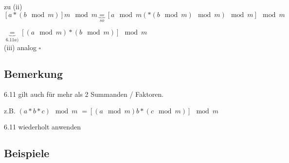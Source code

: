 \documentclass[a4paper, 12pt, twoside] {article}
\begin{document}
 zu (ii) $[a * (b \mod m)] m \mod m \underbrace{=}_{so} [a \mod m( * (b \mod m) \mod m) \mod m] \mod m$

 $\underbrace{=}_{6.11a)} [(a \mod m) * (b \mod m)] \mod m$ \\
 (iii) analog $\square$

 \subsection{Bemerkung}
 6.11 gilt auch für mehr als 2 Summanden / Faktoren.

 z.B. $(a*b*c) \mod m$
 $= [(a \mod m) b * (c \mod m)] \mod m$

 6.11 wiederholt anwenden

 \subsection{Beispiele}
\end{document}
